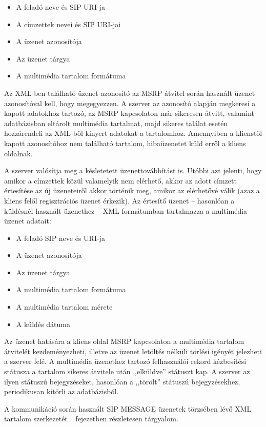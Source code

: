 \begin{itemize}\itemsep1pt
\item	A feladó neve és SIP URI-ja
\item A címzettek nevei és SIP URI-jai
\item A üzenet azonosítója
\item Az üzenet tárgya
\item A multimédia tartalom formátuma
\end{itemize}

Az XML-ben található üzenet azonosító az MSRP átvitel során használt üzenet azonosítóval kell, hogy megegyezzen. A szerver az azonosító alapján megkeresi a kapott adatokhoz tartozó, az MSRP kapcsolaton már sikeresen átvitt, valamint adatbázisban eltárolt multimédia tartalmat, majd sikeres találat esetén hozzárendeli az XML-ből kinyert adatokat a tartalomhoz. Amennyiben a klienstől kapott azonosítóhoz nem található tartalom, hibaüzenetet küld erről a kliens oldalnak.

A szerver valósítja meg a késletetett üzenettovábbítást is. Utóbbi azt jelenti, hogy amikor a címzettek közül valamelyik nem elérhető, akkor az adott címzett értesítése az új üzeneteiről akkor történik meg, amikor az elérhetővé válik (azaz a kliens felől regisztrációs üzenet érkezik). Az értesítő üzenet -- hasonlóan a küldésnél használt üzenethez -- XML formátumban tartalmazza a multimédia üzenet adatait:

\begin{itemize}\itemsep1pt
\item	A feladó SIP neve és URI-ja
\item A üzenet azonosítója
\item Az üzenet tárgya
\item A multimédia tartalom formátuma
\item A multimédia tartalom mérete
\item A küldés dátuma
\end{itemize}

Az üzenet hatására a kliens oldal MSRP kapcsolaton a multimédia tartalom átvitelét kezdeményezheti, illetve az üzenet letöltés nélküli törlési igényét jelezheti a szerver felé. A multimédia üzenethez tartozó felhasználói rekord kézbesítési státusza a tartalom sikeres átvitele után ,,elküldve'' státuszt kap. A szerver az ilyen státuszú bejegyzéseket, hasonlóan a ,,törölt'' státuszú bejegyzésekhez, periodikusan kitörli az adatbázisból. 

A kommunikáció során használt SIP MESSAGE üzenetek törzsében lévő XML tartalom szerkezetét .~fejezetben részletesen tárgyalom.

